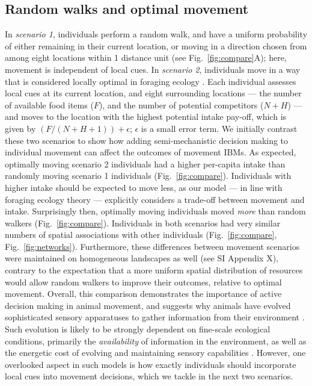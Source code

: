 \subsection{Random walks and optimal movement}

In \textit{scenario 1}, individuals perform a random walk, and have a uniform probability of either remaining in their current location, or moving in a direction chosen from among eight locations within 1 distance unit (see Fig.~\ref{fig:compare}A); here, movement is independent of local cues.
In \textit{scenario 2}, individuals move in a way that is considered locally optimal in foraging ecology \citep{stephens2019,scherer2020}.
Each individual assesses local cues at its current location, and eight surrounding locations --- the number of available food items ($F$), and the number of potential competitors ($N + H$) --- and moves to the location with the highest potential intake pay-off, which is given by $(F / (N + H + 1)) + \epsilon$; $\epsilon$ is a small error term.
We initially contrast these two scenarios to show how adding semi-mechanistic decision making to individual movement can affect the outcomes of movement IBMs.
As expected, optimally moving scenario 2 individuals had a higher per-capita intake than randomly moving scenario 1 individuals (Fig.~\ref{fig:compare}).
Individuals with higher intake should be expected to move less, as our model --- in line with foraging ecology theory \citep{charnov1976} --- explicitly considers a trade-off between movement and intake.
Surprisingly then, optimally moving individuals moved \textit{more} than random walkers (Fig.~\ref{fig:compare}).
Individuals in both scenarios had very similar numbers of spatial associations with other individuals (Fig.~\ref{fig:compare}, Fig.~\ref{fig:networks}).
Furthermore, these differences between movement scenarios were maintained on homogeneous landscapes as well (see SI Appendix X), contrary to the expectation that a more uniform spatial distribution of resources would allow random walkers to improve their outcomes, relative to optimal movement.
Overall, this comparison demonstrates the importance of active decision making in animal movement, and suggests why animals have evolved sophisticated sensory apparatuses to gather information from their environment \citep{avgar2013,berger2022,mann2021,swain2021}.
Such evolution is likely to be strongly dependent on fine-scale ecological conditions, primarily the \textit{availability} of information in the environment, as well as the energetic cost of evolving and maintaining sensory capabilities \citep{swain2021}.
However, one overlooked aspect in such models is how exactly individuals should incorporate local cues into movement decisions, which we tackle in the next two scenarios.

